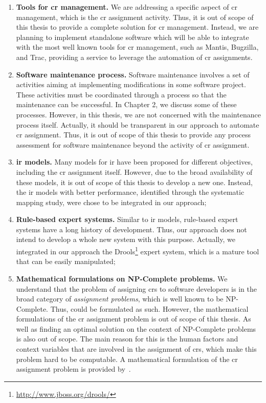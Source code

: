 \begin{enumerate}
  \item \textbf{Tools for \ac{cr} management.} We are addressing
  a specific aspect of \ac{cr} management, which is the \ac{cr} assignment
  activity. Thus, it is out of scope of this thesis to provide a
  complete solution for \ac{cr} management. Instead, we are planning to
  implement standalone software which will be able to integrate with the
  most well known tools for \ac{cr} management, such as Mantis, Bugzilla, and
  Trac, providing a service to leverage the automation of \ac{cr}
  assignments.
  
  \item \textbf{Software maintenance process.} Software maintenance involves
  a set of activities aiming at implementing modifications in some software
  project. These activities must be coordinated through a process so that the
  maintenance can be successful. In Chapter 2, we discuss some of
  these processes. However, in this thesis, we are not concerned with the
  maintenance process itself. Actually, it should be transparent in our approach
  to automate \ac{cr} assignment. Thus, it is out of scope of this
  thesis to provide any process assessment for software maintenance beyond the
  activity of \ac{cr} assignment.
  
  \item \textbf{\ac{ir} models.} Many models for \ac{ir} have been proposed for
  different objectives, including the \ac{cr} assignment itself. However, due to
  the broad availability of these models, it is out of scope of this thesis to
  develop a new one. Instead, the \ac{ir} models with better performance,
  identified through the systematic mapping study, were chose to be
  integrated in our approach;
  
  \item \textbf{Rule-based expert systems.} Similar to \ac{ir} models,
  rule-based expert systems have a long history of development. Thus, our
  approach does not intend to develop a whole new system with this purpose.
  Actually, we integrated in our approach the
  Drools\footnote{\url{http://www.jboss.org/drools/}} expert system, which is a
  mature tool that can be easily manipulated;
  
  \item \textbf{Mathematical formulations on NP-Complete problems.} We
  understand that the problem of assigning \acp{cr} to software developers is in
  the broad category of \emph{assignment problems}, which is well known to be
  NP-Complete. Thus, could be formulated as such. However, the mathematical
  formulations of the \ac{cr} assignment problem is out of scope of this thesis.
  As well as finding an optimal solution on the context of NP-Complete problems
  is also out of scope. The main reason for this is the human factors and
  context variables that are involved in the assignment of \acp{cr}, which
  make this problem hard to be computable. A mathematical formulation of the
  \ac{cr} assignment problem is provided by~\citet{Rahman2009}.
\end{enumerate}

